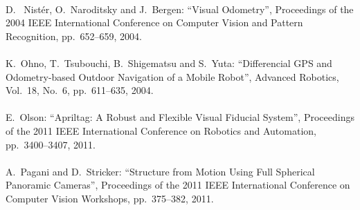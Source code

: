 \begin{mythebibliography}{}
\newpage

\leavevmode \\D.
~Nist\'{e}r, O.~Naroditsky and J.~Bergen:
\newblock ``Visual Odometry'',
\newblock Proceedings of the 2004 IEEE International Conference on Computer Vision and Pattern Recognition, pp.~652--659, 2004.
\\



\leavevmode \\K.~Ohno, T.~Tsubouchi, B.~Shigematsu and S.~Yuta:
\newblock ``Differencial GPS and Odometry-based Outdoor Navigation of a Mobile Robot'',
\newblock Advanced Robotics, Vol.~18, No.~6, pp.~611--635, 2004.
\\

\leavevmode \\E.~Olson:
\newblock ``Apriltag: A Robust and Flexible Visual Fiducial System'',
\newblock Proceedings of the 2011 IEEE International Conference on Robotics and Automation, pp.~3400--3407, 2011.
\\


\leavevmode \\A.~Pagani and D.~Stricker:
\newblock ``Structure from Motion Using Full Spherical Panoramic Cameras'',
\newblock Proceedings of the 2011 IEEE International Conference on Computer Vision Workshops, pp.~375--382, 2011.
\\


\end{mythebibliography}
